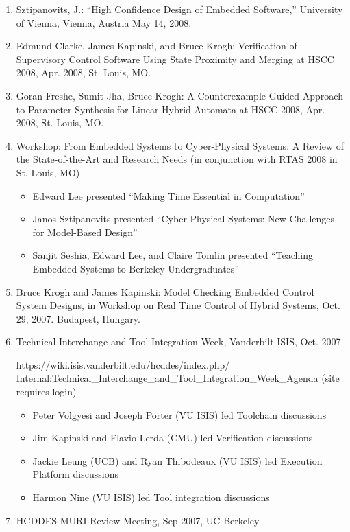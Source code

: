 \begin{enumerate}
\item Sztipanovits, J.: “High Confidence Design of Embedded Software,” University of Vienna, Vienna, Austria May 14, 2008.
\item Edmund Clarke, James Kapinski, and Bruce Krogh: Verification of Supervisory Control Software Using State Proximity and Merging at HSCC 2008, Apr. 2008, St. Louis, MO.
\item Goran Freshe, Sumit Jha, Bruce Krogh: A Counterexample-Guided Approach to Parameter Synthesis for Linear Hybrid Automata at HSCC 2008, Apr. 2008, St. Louis, MO.
\item Workshop: From Embedded Systems to Cyber-Physical Systems: A Review of the State-of-the-Art and Research Needs (in conjunction with RTAS 2008 in St. Louis, MO)
\begin{itemize}
\item Edward Lee presented ``Making Time Essential in Computation''
\item Janos Sztipanovits presented ``Cyber Physical Systems: New Challenges for Model-Based Design''
\item Sanjit Seshia, Edward Lee, and Claire Tomlin presented ``Teaching Embedded Systems to Berkeley Undergraduates''
\end{itemize}
\item Bruce Krogh and James Kapinski: Model Checking Embedded Control System Designs, in Workshop on Real Time Control of Hybrid Systems, Oct. 29, 2007. Budapest, Hungary.
\item Technical Interchange and Tool Integration Week, Vanderbilt ISIS, Oct. 2007 

https://wiki.isis.vanderbilt.edu/hcddes/index.php/ \\
\indent Internal:Technical\_Interchange\_and\_Tool\_Integration\_Week\_Agenda (site requires login)

\begin{itemize}
\item Peter Volgyesi and Joseph Porter (VU ISIS) led Toolchain discussions
\item Jim Kapinski and Flavio Lerda (CMU) led Verification discussions 
\item Jackie Leung (UCB) and Ryan Thibodeaux (VU ISIS) led Execution Platform discussions
\item Harmon Nine (VU ISIS) led Tool integration discussions
\end{itemize}

\item HCDDES MURI Review Meeting, Sep 2007, UC Berkeley 


\end{enumerate}
